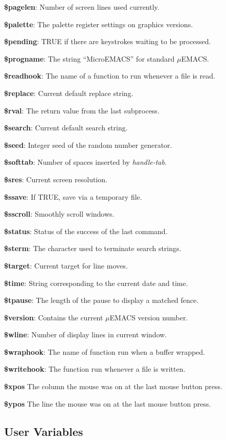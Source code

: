 {\bf \$pagelen}: Number of screen lines used currently.

{\bf \$palette}: The palette register settings on graphics versions.

{\bf \$pending}: TRUE if there are keystrokes waiting to be processed.

{\bf \$progname}: The string ``MicroEMACS'' for standard $\mu$EMACS.

{\bf \$readhook}: The name of a function to run whenever a file is read.

{\bf \$replace}: Current default replace string.

{\bf \$rval}: The return value from the last subprocess.

{\bf \$search}: Current default search string.

{\bf \$seed}: Integer seed of the random number generator.

{\bf \$softtab}: Number of spaces inserted by {\it handle-tab}.

{\bf \$sres}: Current screen resolution.

{\bf \$ssave}: If TRUE, save via a temporary file.

{\bf \$sscroll}: Smoothly scroll windows.

{\bf \$status}: Status of the success of the last command.

{\bf \$sterm}: The character used to terminate search strings.

{\bf \$target}: Current target for line moves.

{\bf \$time}: String corresponding to the current date and time.

{\bf \$tpause}: The length of the pause to display a matched fence.

{\bf \$version}: Contains the current $\mu$EMACS version number.

{\bf \$wline}: Number of display lines in current window.

{\bf \$wraphook}: The name of function run when a buffer wrapped.

{\bf \$writehook}: The function run whenever a file is written.

{\bf \$xpos} The column the mouse was on at the last mouse button press.

{\bf \$ypos} The line the mouse was on at the last mouse button press.

\subsection{User Variables}


